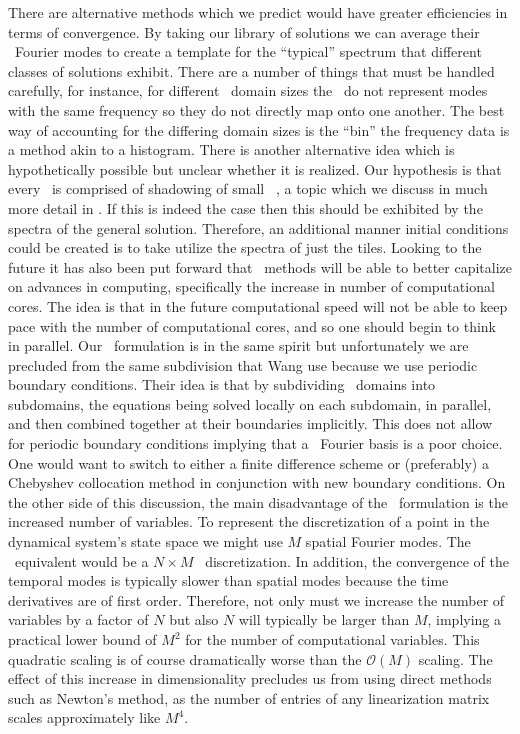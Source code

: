 There are alternative methods which we
predict would have greater efficiencies
in terms of convergence.
By taking our library of solutions we can average their
\spt\ Fourier modes to create a template for the ``typical'' spectrum
that different classes of solutions exhibit. There are a number
of things that must be handled carefully, for instance,
for different \spt\ domain sizes the \Fcs\ do not represent
modes with the same frequency so they do not directly map onto
one another. The best way of accounting for the differing domain
sizes is the ``bin'' the frequency data is a method
akin to a histogram. There is another alternative
idea which is hypothetically possible but unclear
whether it is realized.
Our hypothesis is that every \twot\ is comprised of
shadowing of small \spt\ \twots, a topic which we discuss in
much more detail in . If this is
indeed the case then this should be exhibited by
the spectra of the general solution. Therefore,
an additional manner initial conditions could be
created is to take utilize the spectra of just the
tiles.
Looking to the future it has also been put forward that \spt\ methods
will be able to better capitalize on advances in computing, specifically
the increase in number of computational cores.
The idea is that in the future computational speed will not be able
to keep pace with the number of computational cores, and so
one should begin to think in parallel.
Our \spt\ formulation is in the same spirit but unfortunately
we are precluded from the same subdivision that Wang \etal{} use
because we use periodic boundary conditions. Their idea
is that by subdividing \spt\ domains into subdomains, the equations
being solved locally on each subdomain, in parallel, and then combined
together at their boundaries implicitly. This does not allow for
periodic boundary conditions implying that a \spt\ Fourier basis
is a poor choice. One would want to switch
to either a finite difference scheme or (preferably) a Chebyshev
collocation method in conjunction with new boundary conditions.
On the other side of this discussion, the main
disadvantage of the \spt\ formulation is the increased
number of variables.
To represent the discretization of
a point in the dynamical system's state space we
might use $M$ spatial Fourier modes. The \spt\ equivalent would
be a $N \times M$ \spt\ discretization. In addition, the convergence of
the temporal modes is typically slower than spatial modes because
the time derivatives are of first order. Therefore, not
only must we increase the number of variables by a factor of $N$
but also $N$ will typically be larger than $M$, implying a practical
lower bound of $M^2$ for the number of computational variables. This
quadratic scaling is of course dramatically worse than the $\mathcal{O}(M)$
scaling. The effect of this increase in dimensionality precludes
us from using direct methods such as Newton's method,
as the number of entries of any linearization matrix scales approximately
like $M^4$.



